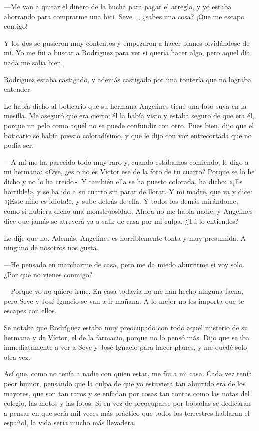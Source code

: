 \documentclass{barcodevapor3pags}
\begin{document}
---Me van a quitar el dinero de la hucha para pagar el arreglo, y yo
estaba ahorrando para comprarme una bici. Seve..., ¿sabes una cosa? ¡Que
me escapo contigo!~

Y los dos se pusieron muy contentos y empezaron a hacer planes
olvidándose de mí. Yo me fui a buscar a Rodríguez para ver si quería
hacer algo, pero aquel día nada me salía bien.~

Rodríguez estaba castigado, y además castigado por una tontería que no
lograba entender.~

Le había dicho al boticario que su hermana Angelines tiene una foto suya
en la mesilla. Me aseguró que era cierto; él la había visto y estaba
seguro de que era él, porque un pelo como aquél no se puede confundir
con otro. Pues bien, dijo que el boticario se había puesto coloradísimo,
y que le dijo con voz entrecortada que no podía ser.~

---A mí me ha parecido todo muy raro y, cuando estábamos comiendo, le
digo a mi hermana: «Oye, ¿es o no es Víctor ese de la foto de tu cuarto?
Porque se lo he dicho y no lo ha creído». Y también ella se ha puesto
colorada, ha dicho: «¡Es horrible!», y se ha ido a su cuarto sin parar
de llorar. Y mi madre, que va y dice: «¡Este niño es idiota!», y sube
detrás de ella. Y todos los demás mirándome, como si hubiera dicho una
monstruosidad. Ahora no me habla nadie, y Angelines dice que jamás se
atreverá ya a salir de casa por mi culpa. ¿Tú lo entiendes?~

Le dije que no. Además, Angelines es horriblemente tonta y muy
presumida. A ninguno de nosotros nos gusta.~

---He pensado en marcharme de casa, pero me da miedo aburrirme si voy
solo. ¿Por qué no vienes conmigo?~

---Porque yo no quiero irme. En casa todavía no me han hecho ninguna
faena, pero Seve y José Ignacio se van a ir mañana. A lo mejor no les
importa que te escapes con ellos.~

Se notaba que Rodríguez estaba muy preocupado con todo aquel misterio de
su hermana y de Víctor, el de la farmacio, porque no lo pensó más. Dijo
que se iba inmediatamente a ver a Seve y José Ignacio para hacer planes,
y me quedé solo otra vez.~

Así que, como no tenía a nadie con quien estar, me fui a mi casa. Cada
vez tenía peor humor, pensando que la culpa de que yo estuviera tan
aburrido era de los mayores, que son tan raros y se enfadan por cosas
tan tontas como las notas del colegio, las motos y las fotos. Si en vez
de preocuparse por bobadas se dedicaran a pensar en que sería mil veces
más práctico que todos los terrestres hablaran el español, la vida sería
mucho más llevadera.~
\end{document}
